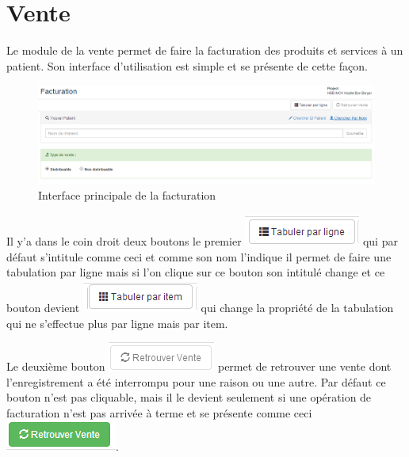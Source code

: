 \documentclass[12pt,a4paper]{report}
\begin{document}
\section{Vente}
Le module de la vente permet de faire la facturation des produits et services à un patient. Son interface d'utilisation est simple et se présente de cette façon.

\begin{figure}[h]
\begin{center}
\includegraphics[width=14cm]{pic/InterfacePrinciFact.png}
\end{center}
\caption{Interface principale de la facturation}
\label{Interface principale de la facturation}
\end{figure}

Il y'a dans le coin droit deux boutons le premier \includegraphics[scale=0.7]{pic/tabulerParLigne.png}  qui par défaut s'intitule comme ceci et comme son nom l'indique il permet de faire une tabulation par ligne mais si l'on clique sur ce bouton son intitulé change et ce bouton devient 
\includegraphics[scale=0.7]{pic/tabulerParItem.png}  qui change la propriété de la tabulation qui ne s'effectue plus par ligne mais par item. 

Le deuxième bouton \includegraphics[scale=0.7]{pic/RetrouverVente.png}  permet de retrouver une vente dont l'enregistrement a été interrompu pour une raison ou une autre. Par défaut ce bouton n'est pas cliquable, mais il le devient seulement si une opération de facturation n'est pas arrivée à terme et se présente comme ceci \includegraphics[scale=0.7]{pic/RetrouverVenteGreen.png}.
\end{document}
